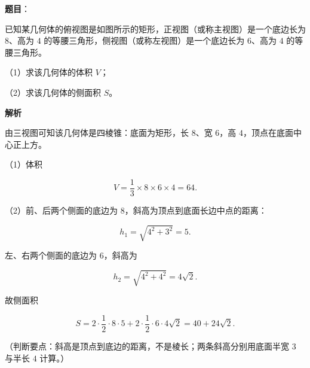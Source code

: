 \begin{answer}

\textbf{题目}：

已知某几何体的俯视图是如图所示的矩形，正视图（或称主视图）是一个底边长为 $8$、高为 $4$ 的等腰三角形，侧视图（或称左视图）是一个底边长为 $6$、高为 $4$ 的等腰三角形。

（1）求该几何体的体积 $V$；

（2）求该几何体的侧面积 $S$。
\nopagebreak[4]
\begin{center}\end{center}
\nopagebreak[4]
\textbf{解析}

由三视图可知该几何体是四棱锥：底面为矩形，长 $8$、宽 $6$，高 $4$，顶点在底面中心正上方。

（1）体积

\nopagebreak[4]
\[V=\frac13\times8\times6\times4=64.\]

（2）前、后两个侧面的底边为 $8$，斜高为顶点到底面长边中点的距离：

\nopagebreak[4]
\[h_1=\sqrt{4^2+3^2}=5.\]

左、右两个侧面的底边为 $6$，斜高为

\nopagebreak[4]
\[h_2=\sqrt{4^2+4^2}=4\sqrt2.\]

故侧面积

\nopagebreak[4]
\[S=2\cdot\frac12\cdot8\cdot5+2\cdot\frac12\cdot6\cdot4\sqrt2=40+24\sqrt2.\]

（判断要点：斜高是顶点到底边的距离，不是棱长；两条斜高分别用底面半宽 $3$ 与半长 $4$ 计算。）


\end{answer}
